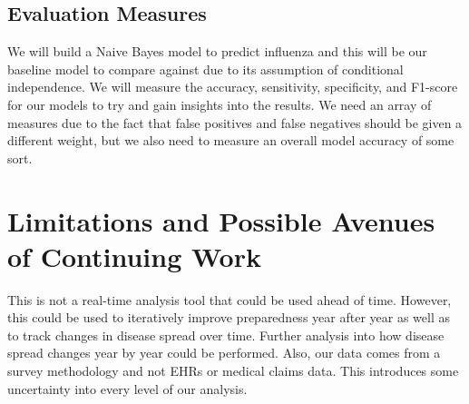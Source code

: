 \documentclass[twoside,11pt]{article}
\begin{document}
\subsection{Evaluation Measures}
We will build a Naive Bayes model to predict influenza and this will be our
baseline model to compare against due to its assumption of conditional
independence.  We will measure the accuracy, sensitivity, specificity, and
F1-score for our models to try and gain insights into the results.  We need an
array of measures due to the fact that false positives and false negatives
should be given a different weight, but we also need to measure an overall model
accuracy of some sort.
\section{Limitations and Possible Avenues of Continuing Work}
This is not a real-time analysis tool that could be used ahead of time.
However, this could be used to iteratively improve preparedness year after year
as well as to track changes in disease spread over time.  Further analysis into
how disease spread changes year by year could be performed.  Also, our data
comes from a survey methodology and not EHRs or medical claims data.  This
introduces some uncertainty into every level of our analysis.

\end{document}
